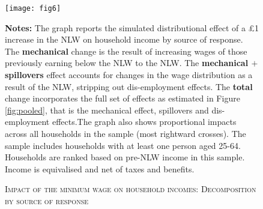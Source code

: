 \begin{figure}[pth]
\caption{\textsc{Impact of the minimum wage on household incomes: Decomposition by source of response}}
\label{fig:hhincmechspillsplit}
\begin{center}
\texttt{[image: fig6]}
\end{center}
\par
\footnotesize{\textbf{Notes:} The graph reports the simulated distributional effect of a \pounds 1 increase in the NLW on household income by source of response. The \textbf{mechanical} change is the result of increasing wages of those previously earning below the NLW to the NLW. The \textbf{mechanical $+$ spillovers} effect accounts for changes in the wage distribution as a result of the NLW, stripping out dis-employment effects. The \textbf{total} change incorporates the full set of effects as estimated in Figure \ref{fig:pooled}, that is the mechanical effect, spillovers and dis-employment effects.The graph also shows proportional impacts across all households in the sample (most rightward crosses). The sample includes households with at least one person aged 25-64. Households are ranked based on pre-NLW income in this sample. Income is equivalised and net of taxes and benefits.}
\end{figure}



\clearpage

